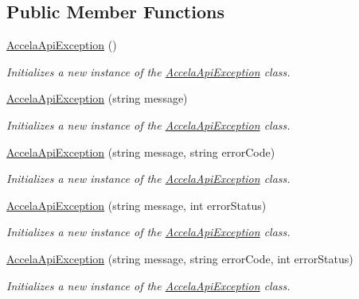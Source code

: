 \subsection*{Public Member Functions}
\begin{DoxyCompactItemize}
\item 
\hyperlink{class_accela_1_1_windows_store_s_d_k_1_1_accela_api_exception_a5f9dfcaadddf7a8f4ab62e1f1268c6b0}{Accela\+Api\+Exception} ()
\begin{DoxyCompactList}\small\item\em Initializes a new instance of the \hyperlink{class_accela_1_1_windows_store_s_d_k_1_1_accela_api_exception}{Accela\+Api\+Exception} class. \end{DoxyCompactList}\item 
\hyperlink{class_accela_1_1_windows_store_s_d_k_1_1_accela_api_exception_a10d0c1ca8babc6a074dd8764d744c3d0}{Accela\+Api\+Exception} (string message)
\begin{DoxyCompactList}\small\item\em Initializes a new instance of the \hyperlink{class_accela_1_1_windows_store_s_d_k_1_1_accela_api_exception}{Accela\+Api\+Exception} class. \end{DoxyCompactList}\item 
\hyperlink{class_accela_1_1_windows_store_s_d_k_1_1_accela_api_exception_a1233d1a4da44bc57c11984944c61cb8d}{Accela\+Api\+Exception} (string message, string error\+Code)
\begin{DoxyCompactList}\small\item\em Initializes a new instance of the \hyperlink{class_accela_1_1_windows_store_s_d_k_1_1_accela_api_exception}{Accela\+Api\+Exception} class. \end{DoxyCompactList}\item 
\hyperlink{class_accela_1_1_windows_store_s_d_k_1_1_accela_api_exception_ad873628090a00f4721c0d1b5f009c7b1}{Accela\+Api\+Exception} (string message, int error\+Status)
\begin{DoxyCompactList}\small\item\em Initializes a new instance of the \hyperlink{class_accela_1_1_windows_store_s_d_k_1_1_accela_api_exception}{Accela\+Api\+Exception} class. \end{DoxyCompactList}\item 
\hyperlink{class_accela_1_1_windows_store_s_d_k_1_1_accela_api_exception_a6796553f0b564f0affd1d6b416791d6d}{Accela\+Api\+Exception} (string message, string error\+Code, int error\+Status)
\begin{DoxyCompactList}\small\item\em Initializes a new instance of the \hyperlink{class_accela_1_1_windows_store_s_d_k_1_1_accela_api_exception}{Accela\+Api\+Exception} class. \end{DoxyCompactList}\item 

\end{DoxyCompactItemize}
